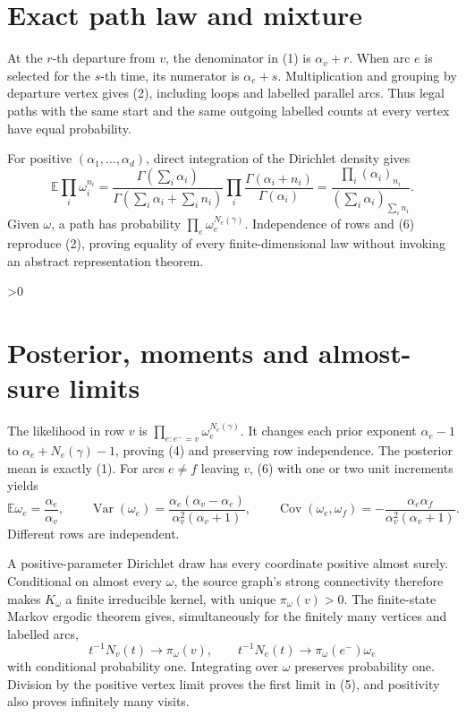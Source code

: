 \documentclass[10pt]{article}
\providecommand{\CRevisionRound}{2}
\newcommand{\E}{\mathbb E}
\begin{document}
\section{Exact path law and mixture}
At the $r$-th departure from $v$, the denominator in (1) is $\alpha_v+r$.
When arc $e$ is selected for the $s$-th time, its numerator is $\alpha_e+s$.
Multiplication and grouping by departure vertex gives (2), including loops and
labelled parallel arcs.  Thus legal paths with the same start and the same
outgoing labelled counts at every vertex have equal probability.

For positive $(\alpha_1,\ldots,\alpha_d)$, direct integration of the Dirichlet
density gives
\[
 \E\prod_i\omega_i^{n_i}
 =\frac{\Gamma(\sum_i\alpha_i)}
        {\Gamma(\sum_i\alpha_i+\sum_i n_i)}
   \prod_i\frac{\Gamma(\alpha_i+n_i)}{\Gamma(\alpha_i)}
 =\frac{\prod_i(\alpha_i)_{n_i}}
        {(\sum_i\alpha_i)_{\sum_i n_i}}.                 \tag{6}
\]
Given $\omega$, a path has probability $\prod_e\omega_e^{N_e(\gamma)}$.
Independence of rows and (6) reproduce (2), proving equality of every
finite-dimensional law without invoking an abstract representation theorem.

\ifnum\CRevisionRound>0
\section{Posterior, moments and almost-sure limits}
The likelihood in row $v$ is
$\prod_{e:e^-=v}\omega_e^{N_e(\gamma)}$.  It changes each prior exponent
$\alpha_e-1$ to $\alpha_e+N_e(\gamma)-1$, proving (4) and preserving row
independence.  The posterior mean is exactly (1).  For arcs $e\ne f$ leaving
$v$, (6) with one or two unit increments yields
\[
\E\omega_e=\frac{\alpha_e}{\alpha_v},\qquad
\operatorname{Var}(\omega_e)=
\frac{\alpha_e(\alpha_v-\alpha_e)}{\alpha_v^2(\alpha_v+1)},\qquad
\operatorname{Cov}(\omega_e,\omega_f)=
-\frac{\alpha_e\alpha_f}{\alpha_v^2(\alpha_v+1)}.         \tag{7}
\]
Different rows are independent.

A positive-parameter Dirichlet draw has every coordinate positive almost
surely.  Conditional on almost every $\omega$, the source graph's strong
connectivity therefore makes $K_\omega$ a finite irreducible kernel, with
unique $\pi_\omega(v)>0$.  The finite-state Markov ergodic theorem gives,
simultaneously for the finitely many vertices and labelled arcs,
\[
t^{-1}N_v(t)\to\pi_\omega(v),\qquad
t^{-1}N_e(t)\to\pi_\omega(e^-)\omega_e
\]
with conditional probability one.  Integrating over $\omega$ preserves
probability one.  Division by the positive vertex limit proves the first
limit in (5), and positivity also proves infinitely many visits.
\end{document}
